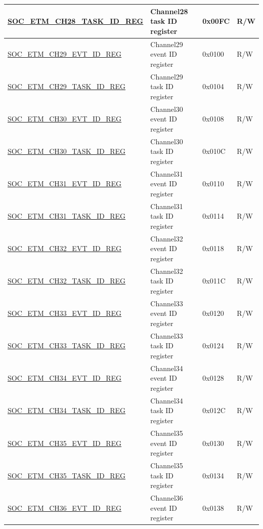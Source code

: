 \begin{longtable}{ | p{6cm} | p{6.4cm} | p{1.3cm} | p{1.8cm} | }
\hyperref[regdesc:SOCETMCH0TASKIDREG]{SOC\_ETM\_CH28\_TASK\_ID\_REG} & Channel28 task ID register & 0x00FC & R/W \\ \hline
\hyperref[regdesc:SOCETMCH0EVTIDREG]{SOC\_ETM\_CH29\_EVT\_ID\_REG} & Channel29 event ID register & 0x0100 & R/W \\ \hline
\hyperref[regdesc:SOCETMCH0TASKIDREG]{SOC\_ETM\_CH29\_TASK\_ID\_REG} & Channel29 task ID register & 0x0104 & R/W \\ \hline
\hyperref[regdesc:SOCETMCH0EVTIDREG]{SOC\_ETM\_CH30\_EVT\_ID\_REG} & Channel30 event ID register & 0x0108 & R/W \\ \hline
\hyperref[regdesc:SOCETMCH0TASKIDREG]{SOC\_ETM\_CH30\_TASK\_ID\_REG} & Channel30 task ID register & 0x010C & R/W \\ \hline
\hyperref[regdesc:SOCETMCH0EVTIDREG]{SOC\_ETM\_CH31\_EVT\_ID\_REG} & Channel31 event ID register & 0x0110 & R/W \\ \hline
\hyperref[regdesc:SOCETMCH0TASKIDREG]{SOC\_ETM\_CH31\_TASK\_ID\_REG} & Channel31 task ID register & 0x0114 & R/W \\ \hline
\hyperref[regdesc:SOCETMCH0EVTIDREG]{SOC\_ETM\_CH32\_EVT\_ID\_REG} & Channel32 event ID register & 0x0118 & R/W \\ \hline
\hyperref[regdesc:SOCETMCH0TASKIDREG]{SOC\_ETM\_CH32\_TASK\_ID\_REG} & Channel32 task ID register & 0x011C & R/W \\ \hline
\hyperref[regdesc:SOCETMCH0EVTIDREG]{SOC\_ETM\_CH33\_EVT\_ID\_REG} & Channel33 event ID register & 0x0120 & R/W \\ \hline
\hyperref[regdesc:SOCETMCH0TASKIDREG]{SOC\_ETM\_CH33\_TASK\_ID\_REG} & Channel33 task ID register & 0x0124 & R/W \\ \hline
\hyperref[regdesc:SOCETMCH0EVTIDREG]{SOC\_ETM\_CH34\_EVT\_ID\_REG} & Channel34 event ID register & 0x0128 & R/W \\ \hline
\hyperref[regdesc:SOCETMCH0TASKIDREG]{SOC\_ETM\_CH34\_TASK\_ID\_REG} & Channel34 task ID register & 0x012C & R/W \\ \hline
\hyperref[regdesc:SOCETMCH0EVTIDREG]{SOC\_ETM\_CH35\_EVT\_ID\_REG} & Channel35 event ID register & 0x0130 & R/W \\ \hline
\hyperref[regdesc:SOCETMCH0TASKIDREG]{SOC\_ETM\_CH35\_TASK\_ID\_REG} & Channel35 task ID register & 0x0134 & R/W \\ \hline
\hyperref[regdesc:SOCETMCH0EVTIDREG]{SOC\_ETM\_CH36\_EVT\_ID\_REG} & Channel36 event ID register & 0x0138 & R/W \\ \hline

\end{longtable}
